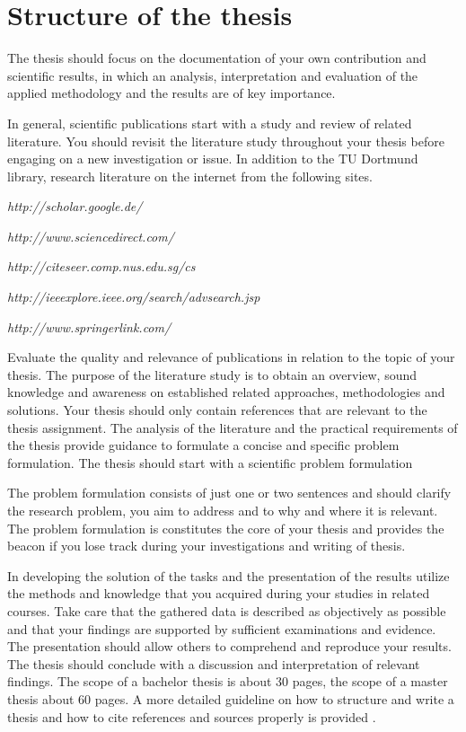 \chapter{Structure of the thesis}
\label{aufbau}

The thesis should focus on the documentation of your own contribution and scientific results, in which an analysis, interpretation and evaluation of the applied methodology and the results are of key importance.

In general, scientific publications start with a study and review of related literature.
You should revisit the literature study throughout your thesis before engaging on a new
investigation or issue.
In addition to the TU Dortmund library, research literature on the internet from the following sites.

\emph{http://scholar.google.de/}

\emph{http://www.sciencedirect.com/}

\emph{http://citeseer.comp.nus.edu.sg/cs}

\emph{http://ieeexplore.ieee.org/search/advsearch.jsp}

\emph{http://www.springerlink.com/}

Evaluate the quality and relevance of publications in relation to the topic of your
thesis.
The purpose of the literature study is to obtain an overview, sound knowledge and awareness on established related approaches, methodologies and solutions. 
Your thesis should only contain references that are relevant to the thesis assignment.
The analysis of the literature and the practical requirements of the thesis provide 
guidance to formulate a concise and specific problem formulation.
The thesis should start with a scientific problem formulation

The problem formulation consists of just one or two sentences and should clarify the research problem, you aim to address and to why and where it is relevant. The problem formulation is constitutes the core of your thesis and provides the beacon if you lose track during your investigations and writing of thesis.

In developing the solution of the tasks and the presentation of the results utilize the methods and knowledge that you acquired during your studies in related courses.
Take care that the gathered data is described as objectively as possible and that your findings are supported by sufficient examinations and evidence.
The presentation should allow others to comprehend and reproduce your results.
The thesis should conclude with a discussion and interpretation of relevant findings.
The scope of a bachelor thesis is about 30 pages, the scope of a master thesis about 60 pages.
A more detailed guideline on how to structure and write a thesis and how to cite references and sources properly is provided \textcite{Leit1}.

